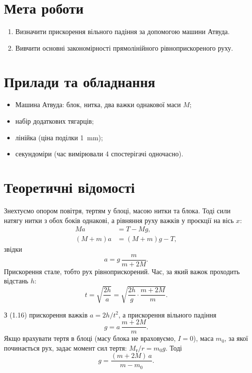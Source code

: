 \documentclass[ukrainian]{ucaphyslab}
\begin{document}
\maketitlepage

\section{Мета роботи}
\begin{enumerate}
  \item Визначити прискорення вільного падіння за допомогою машини Атвуда.
  \item Вивчити основні закономірності прямолінійного рівноприскореного руху.
\end{enumerate}

\section{Прилади та обладнання}
\begin{itemize}
  \item Машина Атвуда: блок, нитка, два важки однакової маси $M$;
  \item набір додаткових тягарців;
  \item лінійка (ціна поділки \SI{1}{\milli\meter});
  \item секундоміри (час вимірювали 4 спостерігачі одночасно).
\end{itemize}

\section{Теоретичні відомості}
Знехтуємо опором повітря, тертям у блоці, масою нитки та блока. Тоді сили натягу нитки
з обох боків однакові, а рівняння руху важків у проєкції на вісь $x$:
\begin{align}
  Ma &= T - Mg, \tag{1.13}\\
  (M+m)a &= (M+m)g - T, \tag{1.14}
\end{align}
звідки
\begin{equation}
  a = g\,\frac{m}{m+2M}. \tag{1.15}
\end{equation}
Прискорення стале, тобто рух рівноприскорений. Час, за який важок проходить відстань $h$:
\begin{equation}
  t = \sqrt{\frac{2h}{a}} = \sqrt{\frac{2h}{g}\cdot\frac{m+2M}{m}}. \tag{1.16}
\end{equation}

З (1.16) прискорення важків $a = 2h/t^2$, а прискорення вільного падіння
\begin{equation}
  g = a\,\frac{m+2M}{m}. \tag{1.17}
\end{equation}
Якщо врахувати тертя в блоці (масу блока не враховуємо, $I=0$), маса $m_0$, за якої
починається рух, задає момент сил тертя: $M_\text{т}/r = m_0 g$. Тоді
\begin{equation}
  g = \frac{(m+2M)\,a}{m - m_0}. \tag{1.26}
\end{equation}
\end{document}
